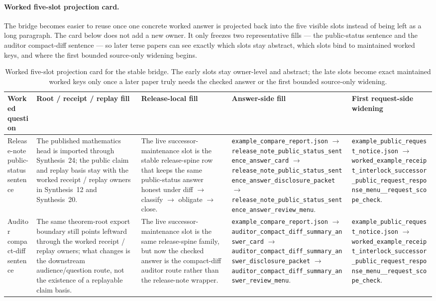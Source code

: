 \documentclass[11pt]{article}
\begin{document}
\paragraph{Worked five-slot projection card.}
The bridge becomes easier to reuse once one concrete worked answer is projected back into the five visible slots instead of being left as a long paragraph. The card below does not add a new owner. It only freezes two representative fills --- the public-status sentence and the auditor compact-diff sentence --- so later terse papers can see exactly which slots stay abstract, which slots bind to maintained worked keys, and where the first bounded source-only widening begins.

\begin{table}[t]
\centering
\small
\begin{tabularx}{\linewidth}{@{}Y Y Y Y Y@{}}
\toprule
Worked question & Root / receipt / replay fill & Release-local fill & Answer-side fill & First request-side widening \\
\midrule
Release-note public-status sentence & The published mathematics head is imported through Synthesis~24; the public claim and replay basis stay with the worked receipt / replay owners in Synthesis~12 and Synthesis~20. & The live successor-maintenance slot is the stable release-spine row that keeps the same public-status answer honest under diff $\to$ classify $\to$ obligate $\to$ close. & \nolinkurl{example_compare_report.json} $\to$ \texttt{release\_note\_public\_status\_sentence\_answer\_card} $\to$ \texttt{release\_note\_public\_status\_sentence\_answer\_disclosure\_packet} $\to$ \texttt{release\_note\_public\_status\_sentence\_answer\_review\_menu}. & \nolinkurl{example_public_request_notice.json} $\to$ \texttt{worked\_example\_receipt\_interlock\_successor\_public\_request\_response\_menu\_\_request\_scope\_check}. \\
Auditor compact-diff sentence & The same theorem-root export boundary still points leftward through the worked receipt / replay owners; what changes is the downstream audience/question route, not the existence of a replayable claim basis. & The live successor-maintenance slot is the same release-spine family, but now the checked answer is the compact-diff auditor route rather than the release-note wrapper. & \nolinkurl{example_compare_report.json} $\to$ \texttt{auditor\_compact\_diff\_summary\_answer\_card} $\to$ \texttt{auditor\_compact\_diff\_summary\_answer\_disclosure\_packet} $\to$ \texttt{auditor\_compact\_diff\_summary\_answer\_review\_menu}. & \nolinkurl{example_public_request_notice.json} $\to$ \texttt{worked\_example\_receipt\_interlock\_successor\_public\_request\_response\_menu\_\_request\_scope\_check}. \\
\bottomrule
\end{tabularx}
\caption{Worked five-slot projection card for the stable bridge. The early slots stay owner-level and abstract; the late slots become exact maintained worked keys only once a later paper truly needs the checked answer or the first bounded source-only widening.}
\label{tab:seriesspine-worked-five-slot}
\end{table}
\end{document}

